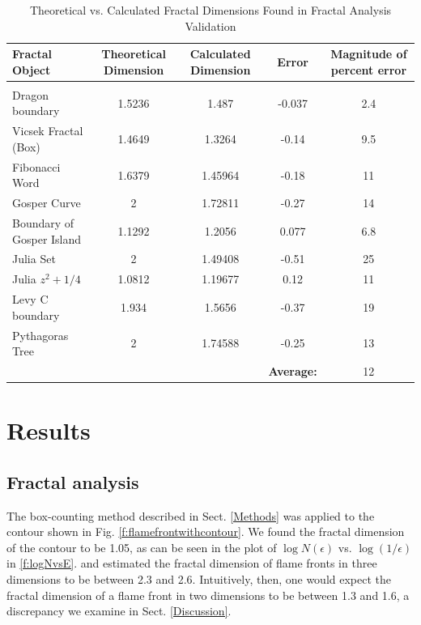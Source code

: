 \documentclass[iop]{emulateapj}
\begin{document}
\begin{table}
\begin{center}
\caption{Theoretical vs. Calculated Fractal Dimensions Found in Fractal Analysis Validation}\label{t:table}
\begin{tabular}{lcccc}
Fractal Object 				&	Theoretical Dimension 	&	Calculated Dimension 	&	Error		&	Magnitude of percent error \\
\hline\\
Dragon boundary				&	1.5236					&	1.487	                &	-0.037		&	2.4	\\
Vicsek Fractal (Box)		& 	1.4649					&	1.3264					&	-0.14		&	9.5	\\
Fibonacci Word				&	1.6379					&	1.45964					&	-0.18 		&	11	\\
Gosper Curve				&	2						&	1.72811					&	-0.27		&	14				\\
Boundary of Gosper Island	&	1.1292					&	1.2056					&	0.077		&	6.8	\\
Julia Set					&	2						&	1.49408					&	-0.51		&	25	\\
Julia $z^2+1/4$				&	1.0812					&	1.19677					&	0.12		&	11	\\
Levy C boundary				&	1.934					&	1.5656					&	-0.37		&	19	\\
Pythagoras Tree				&	2						&	1.74588					&	-0.25		&	13	\\
\hline
\rule{0pt}{4ex}				&							&							& \textbf{Average: } & 12\\
\end{tabular}
\end{center}
\end{table}


\section{Results}\label{Results}

\subsection{Fractal analysis}\label{FractalResults}
The box-counting method described in Sect. \ref{Methods} was applied to the contour shown in Fig. \ref{f:flamefrontwithcontour}. We found the fractal dimension of the contour to be 1.05, as can be seen in the plot of $\log N(\epsilon)$ vs. $\log (1 / \epsilon)$ in \ref{f:logNvsE}. \cite{Timmes1994} and \cite{Blinnikov1996} estimated the fractal dimension of flame fronts in three dimensions to be between 2.3 and 2.6. Intuitively, then, one would expect the fractal dimension of a flame front in two dimensions to be between 1.3 and 1.6, a discrepancy we examine in Sect. \ref{Discussion}.
\end{document}
